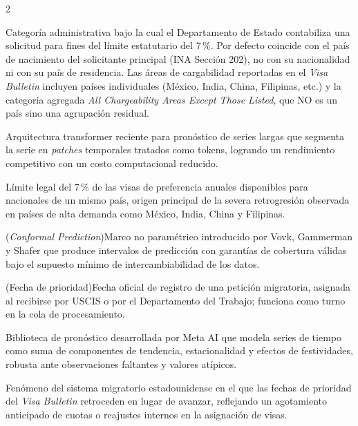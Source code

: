 \documentclass[12pt,letterpaper]{report}
\begin{document}
\begin{multicols}{2}
\begin{description}[leftmargin=0pt, labelindent=0pt, itemindent=0pt,
                    labelsep=0.4em, font=\bfseries\scriptsize,
                    itemsep=1pt, parsep=0pt, topsep=0pt]
    \item[País de cargabilidad (\textit{chargeability area})] Categoría administrativa bajo la cual el Departamento de Estado contabiliza una solicitud para fines del límite estatutario del 7\,\%. Por defecto coincide con el país de nacimiento del solicitante principal (INA Sección 202), no con su nacionalidad ni con su país de residencia. Las áreas de cargabilidad reportadas en el \textit{Visa Bulletin} incluyen países individuales (México, India, China, Filipinas, etc.) y la categoría agregada \textit{All Chargeability Areas Except Those Listed}, que NO es un país sino una agrupación residual.

    \item[PatchTST] Arquitectura transformer reciente para pronóstico de series largas que segmenta la serie en \textit{patches} temporales tratados como tokens, logrando un rendimiento competitivo con un costo computacional reducido.

    \item[Per-country limit] Límite legal del 7\,\% de las visas de preferencia anuales disponibles para nacionales de un mismo país, origen principal de la severa retrogresión observada en países de alta demanda como México, India, China y Filipinas.

    \item[Predicción conforme] (\textit{Conformal Prediction})\hspace{0.3em}Marco no paramétrico introducido por Vovk, Gammerman y Shafer que produce intervalos de predicción con garantías de cobertura válidas bajo el supuesto mínimo de intercambiabilidad de los datos.

    \item[Priority Date] (Fecha de prioridad)\hspace{0.3em}Fecha oficial de registro de una petición migratoria, asignada al recibirse por USCIS o por el Departamento del Trabajo; funciona como turno en la cola de procesamiento.

    \item[Prophet] Biblioteca de pronóstico desarrollada por Meta AI que modela series de tiempo como suma de componentes de tendencia, estacionalidad y efectos de festividades, robusta ante observaciones faltantes y valores atípicos.

    \item[Retrogresión] Fenómeno del sistema migratorio estadounidense en el que las fechas de prioridad del \textit{Visa Bulletin} retroceden en lugar de avanzar, reflejando un agotamiento anticipado de cuotas o reajustes internos en la asignación de visas.


\end{description}
\end{multicols}
\end{document}

